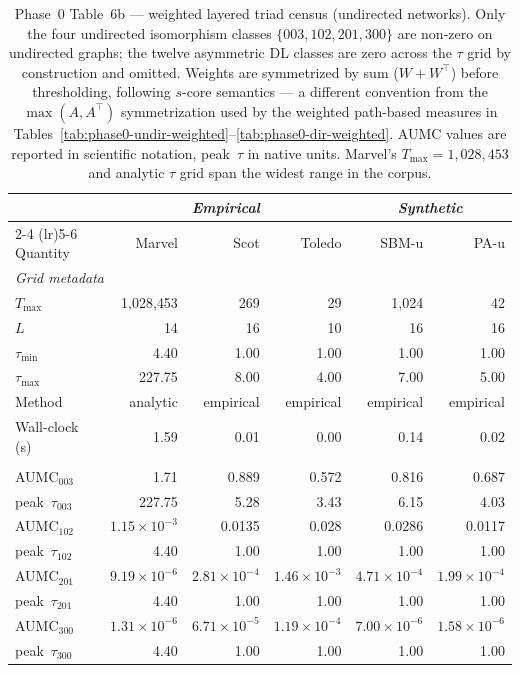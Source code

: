 \documentclass[11pt]{article}
\begin{document}
\begin{table}[!htbp]
\centering
\footnotesize
\setlength{\tabcolsep}{4pt}
\begin{tabular}{l r r r | r r}
\toprule
& \multicolumn{3}{c|}{\textit{Empirical}} & \multicolumn{2}{c}{\textit{Synthetic}} \\
\cmidrule(lr){2-4} \cmidrule(lr){5-6}
Quantity & Marvel & Scot & Toledo & SBM-u & PA-u \\
\midrule
\multicolumn{6}{l}{\textit{Grid metadata}} \\
$T_{\max}$    & 1{,}028{,}453 & 269 & 29 & 1{,}024 & 42 \\
$L$            & 14 & 16 & 10 & 16 & 16 \\
$\tau_{\min}$  & 4.40 & 1.00 & 1.00 & 1.00 & 1.00 \\
$\tau_{\max}$  & 227.75 & 8.00 & 4.00 & 7.00 & 5.00 \\
Method         & analytic & empirical & empirical & empirical & empirical \\
Wall-clock (s) & 1.59 & 0.01 & 0.00 & 0.14 & 0.02 \\
\addlinespace
\multicolumn{6}{l}{\textit{Per-class AUMC and peak~$\tau$}} \\
AUMC$_{003}$    & 1.71 & 0.889 & 0.572 & 0.816 & 0.687 \\
peak~$\tau_{003}$ & 227.75 & 5.28 & 3.43 & 6.15 & 4.03 \\
AUMC$_{102}$    & $1.15\times10^{-3}$ & 0.0135 & 0.028 & 0.0286 & 0.0117 \\
peak~$\tau_{102}$ & 4.40 & 1.00 & 1.00 & 1.00 & 1.00 \\
AUMC$_{201}$    & $9.19\times10^{-6}$ & $2.81\times10^{-4}$ & $1.46\times10^{-3}$ & $4.71\times10^{-4}$ & $1.99\times10^{-4}$ \\
peak~$\tau_{201}$ & 4.40 & 1.00 & 1.00 & 1.00 & 1.00 \\
AUMC$_{300}$    & $1.31\times10^{-6}$ & $6.71\times10^{-5}$ & $1.19\times10^{-4}$ & $7.00\times10^{-6}$ & $1.58\times10^{-6}$ \\
peak~$\tau_{300}$ & 4.40 & 1.00 & 1.00 & 1.00 & 1.00 \\
\bottomrule
\end{tabular}
\caption{Phase~0 Table~6b --- weighted layered triad census (undirected networks). Only the four undirected isomorphism classes $\{003, 102, 201, 300\}$ are non-zero on undirected graphs; the twelve asymmetric DL classes are zero across the $\tau$ grid by construction and omitted. Weights are symmetrized by sum ($W + W^\top$) before thresholding, following $s$-core semantics --- a different convention from the $\max(A, A^\top)$ symmetrization used by the weighted path-based measures in Tables~\ref{tab:phase0-undir-weighted}--\ref{tab:phase0-dir-weighted}. AUMC values are reported in scientific notation, peak~$\tau$ in native units. Marvel's $T_{\max} = 1{,}028{,}453$ and analytic $\tau$ grid span the widest range in the corpus.}
\label{tab:phase0-triad-weighted-undir}
\end{table}
\end{document}
